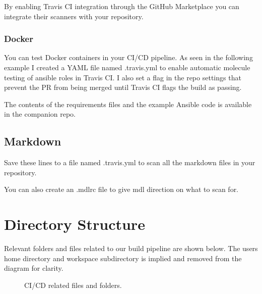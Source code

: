 \justify
By enabling Travis CI integration through the GitHub Marketplace you
can integrate their scanners with your repository.

\subsubsection{Docker}

\justify
You can test Docker containers in your CI/CD pipeline. As seen in the
following example I created a YAML file named .travis.yml to enable
automatic molecule testing of ansible roles in Travis CI. I also set a
flag in the repo settings that prevent the PR from being merged until
Travis CI flags the build as passing.

\justify
%	

The contents of the requirements files and the example Ansible code is
available in the companion repo.


\subsection{Markdown}

Save these lines to a file named .travis.yml to scan all the markdown files in your repository.

\justify
%	

\justify
You can also create an .mdlrc file to give mdl direction on what to scan for.

\justify
%	

\clearpage

\section{Directory Structure}

\justify
Relevant folders and files related to our build pipeline are shown below. The users home directory
and workspace subdirectory is implied and removed from the diagram for clarity.

\begin{figure}[!htb]
	
	\caption{CI/CD related files and folders.}
\end{figure}
